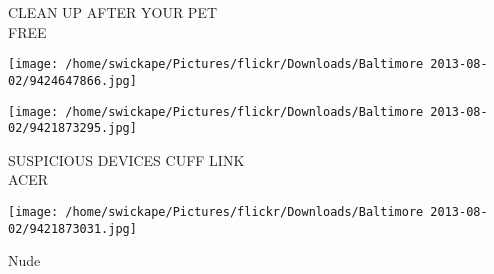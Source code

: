 \documentclass[10pt,letterpaper]{article}
\begin{document}
CLEAN UP AFTER YOUR PET\\
FREE
\pagebreak

\texttt{[image: /home/swickape/Pictures/flickr/Downloads/Baltimore 2013-08-02/9424647866.jpg]}

\vspace{0.25in}
\texttt{[image: /home/swickape/Pictures/flickr/Downloads/Baltimore 2013-08-02/9421873295.jpg]}

SUSPICIOUS DEVICES CUFF LINK\\
ACER
\pagebreak

\texttt{[image: /home/swickape/Pictures/flickr/Downloads/Baltimore 2013-08-02/9421873031.jpg]}

Nude
\pagebreak
\end{document}
